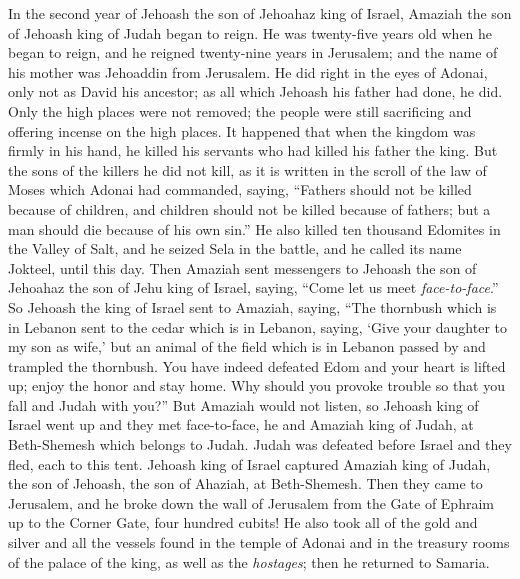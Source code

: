 \begin{biblechapter} %
 In the second year of Jehoash the son of Jehoahaz king of Israel, Amaziah the son of Jehoash king of Judah began to reign.
\verse He was twenty-five years old when he began to reign, and he reigned twenty-nine years in Jerusalem; and the name of his mother was Jehoaddin from Jerusalem.
\verse He did right in the eyes of Adonai, only not as David his ancestor; as all which Jehoash his father had done, he did.
\verse Only the high places were not removed; the people were still sacrificing and offering incense on the high places.
\verse It happened that when the kingdom was firmly in his hand, he killed his servants who had killed his father the king.
\verse But the sons of the killers he did not kill, as it is written in the scroll of the law of Moses which Adonai had commanded, saying, “Fathers should not be killed because of children, and children should not be killed because of fathers; but a man should die because of his own sin.”
\verse He also killed ten thousand Edomites in the Valley of Salt, and he seized Sela in the battle, and he called its name Jokteel, until this day.
\verse Then Amaziah sent messengers to Jehoash the son of Jehoahaz the son of Jehu king of Israel, saying, “Come let us meet \textit{face-to-face}.”
\verse So Jehoash the king of Israel sent to Amaziah, saying, “The thornbush which is in Lebanon sent to the cedar which is in Lebanon, saying, ‘Give your daughter to my son as wife,’ but an animal of the field which is in Lebanon passed by and trampled the thornbush.
\verse You have indeed defeated Edom and your heart is lifted up; enjoy the honor and stay home. Why should you provoke trouble so that you fall and Judah with you?”
\verse But Amaziah would not listen, so Jehoash king of Israel went up and they met face-to-face, he and Amaziah king of Judah, at Beth-Shemesh which belongs to Judah.
\verse Judah was defeated before Israel and they fled, each to this tent.
\verse Jehoash king of Israel captured Amaziah king of Judah, the son of Jehoash, the son of Ahaziah, at Beth-Shemesh. Then they came to Jerusalem, and he broke down the wall of Jerusalem from the Gate of Ephraim up to the Corner Gate, four hundred cubits!
\verse He also took all of the gold and silver and all the vessels found in the temple of Adonai and in the treasury rooms of the palace of the king, as well as the \textit{hostages}; then he returned to Samaria.

\end{biblechapter}
